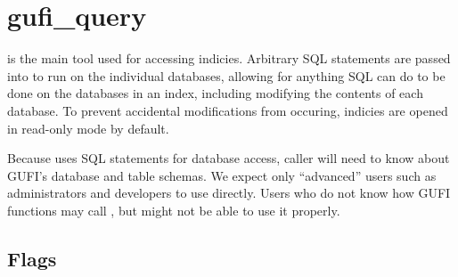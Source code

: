 \section{gufi\_query}

\gufiquery is the main tool used for accessing indicies. Arbitrary SQL
statements are passed into \gufiquery to run on the individual
databases, allowing for anything SQL can do to be done on the
databases in an index, including modifying the contents of each
database. To prevent accidental modifications from occuring, indicies
are opened in read-only mode by default.

Because \gufiquery uses SQL statements for database access, caller
will need to know about GUFI's database and table schemas. We expect
only ``advanced'' users such as administrators and developers to use
\gufiquery directly. Users who do not know how GUFI functions may call
\gufiquery, but might not be able to use it properly.

\subsection{Flags}

